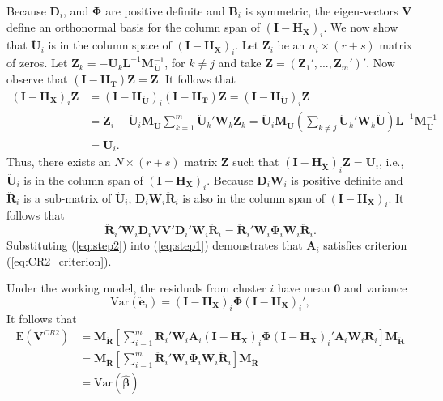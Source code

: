 \documentclass[draft]{ectaart}\usepackage[]{graphicx}\usepackage[]{color}
\newcommand{\E}{\text{E}}
\newcommand{\Var}{\text{Var}}
\newcommand{\bm}{\mathbf}
\newcommand{\bs}{\boldsymbol}
\begin{document}
Because $\bm{D}_i$, and $\bs\Phi$ are positive definite and $\bm{B}_i$ is symmetric, the eigen-vectors $\bm{V}$ define an orthonormal basis for the column span of $\left(\bm{I} - \bm{H_{\ddot{X}}}\right)_i$.
We now show that $\bm{\ddot{U}}_i$ is in the column space of $\left(\bm{I} - \bm{H_X}\right)_i$. 
Let $\bm{Z}_i$ be an $n_i \times (r + s)$ matrix of zeros. 
Let $\bm{Z}_k = - \bm{\ddot{U}}_k \bm{L}^{-1}\bm{M}_{\bm{\ddot{U}}}^{-1}$, for $k \neq j$ and take $\bm{Z} = \left(\bm{Z}_1',...,\bm{Z}_m'\right)'$. 
Now observe that $\left(\bm{I} - \bm{H_T}\right) \bm{Z} = \bm{Z}$. 
It follows that 
\begin{align*}
\left(\bm{I} - \bm{H_X}\right)_i \bm{Z} &= \left(\bm{I} - \bm{H_{\ddot{U}}}\right)_i \left(\bm{I} - \bm{H_T}\right) \bm{Z} = \left(\bm{I} - \bm{H_{\ddot{U}}}\right)_i \bm{Z} \\
&= \bm{Z}_i - \bm{\ddot{U}}_i\bm{M_{\ddot{U}}}\sum_{k=1}^m \bm{\ddot{U}}_k'\bm{W}_k\bm{Z}_k = \bm{\ddot{U}}_i\bm{M_{\ddot{U}}} \left(\sum_{k \neq j} \bm{\ddot{U}}_k' \bm{W}_k \bm{\ddot{U}} \right) \bm{L}^{-1}\bm{M}_{\bm{\ddot{U}}}^{-1} \\
&= \bm{\ddot{U}}_i.
\end{align*}
Thus, there exists an $N \times (r + s)$ matrix $\bm{Z}$ such that $\left(\bm{I} - \bm{H_{\ddot{X}}}\right)_i \bm{Z} = \bm{\ddot{U}}_i$, i.e., $\bm{\ddot{U}}_i$ is in the column span of $\left(\bm{I} - \bm{H_X}\right)_i$. Because $\bm{D}_i \bm{W}_i$ is positive definite and $\bm{\ddot{R}}_i$ is a sub-matrix of $\bm{\ddot{U}}_i$, $\bm{D}_i\bm{W}_i\bm{\ddot{R}}_i$ is also in the column span of $\left(\bm{I} - \bm{H_X}\right)_i$. It follows that 
\begin{equation}
\label{eq:step2}
\bm{\ddot{R}}_i' \bm{W}_i \bm{D}_i \bm{V}\bm{V}' \bm{D}_i' \bm{W}_i \bm{\ddot{R}}_i = \bm{\ddot{R}}_i' \bm{W}_i \bs\Phi_i \bm{W}_i \bm{\ddot{R}}_i.
\end{equation}
Substituting (\ref{eq:step2}) into (\ref{eq:step1}) demonstrates that $\bm{A}_i$ satisfies criterion (\ref{eq:CR2_criterion}).

Under the working model, the residuals from cluster $i$ have mean $\bm{0}$ and variance \[
\Var\left(\bm{\ddot{e}}_i\right) = \left(\bm{I} - \bm{H_X}\right)_i \bs\Phi \left(\bm{I} - \bm{H_X}\right)_i',\] 
It follows that 
\begin{align*}
\E\left(\bm{V}^{CR2}\right) &= \bm{M_{\ddot{R}}}\left[\sum_{i=1}^m \bm{\ddot{R}}_i' \bm{W}_i \bm{A}_i \left(\bm{I} - \bm{H_X}\right)_i \bs\Phi \left(\bm{I} - \bm{H_X}\right)_i' \bm{A}_i \bm{W}_i \bm{\ddot{R}}_i \right] \bm{M_{\ddot{R}}} \\
&= \bm{M_{\ddot{R}}}\left[\sum_{i=1}^m \bm{\ddot{R}}_i' \bm{W}_i \bs\Phi_i \bm{W}_i \bm{\ddot{R}}_i \right] \bm{M_{\ddot{R}}} \\
&= \Var\left(\bs{\hat\beta}\right)
\end{align*}
\end{document}
